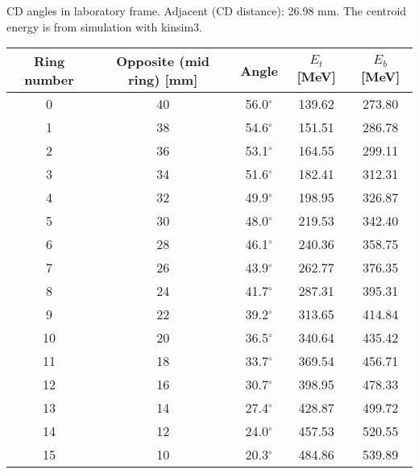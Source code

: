 \caption{CD angles in laboratory frame. Adjacent (CD distance): 26.98 mm. The centroid energy is from simulation with kinsim3.}
\label{tab:CD_angles}
\begin{tabular}{ccccc}
\hline
Ring number  &  Opposite (mid ring) [mm] &  Angle         &  $E_t$ [MeV]  &  $E_b$ [MeV]  \\
\hline
0            &  40                       &  56.0$^\circ$  &  139.62       &  273.80       \\
1            &  38                       &  54.6$^\circ$  &  151.51       &  286.78       \\
2            &  36                       &  53.1$^\circ$  &  164.55       &  299.11       \\
3            &  34                       &  51.6$^\circ$  &  182.41       &  312.31       \\
4            &  32                       &  49.9$^\circ$  &  198.95       &  326.87       \\
5            &  30                       &  48.0$^\circ$  &  219.53       &  342.40       \\
6            &  28                       &  46.1$^\circ$  &  240.36       &  358.75       \\
7            &  26                       &  43.9$^\circ$  &  262.77       &  376.35       \\
8            &  24                       &  41.7$^\circ$  &  287.31       &  395.31       \\
9            &  22                       &  39.2$^\circ$  &  313.65       &  414.84       \\
10           &  20                       &  36.5$^\circ$  &  340.64       &  435.42       \\
11           &  18                       &  33.7$^\circ$  &  369.54       &  456.71       \\
12           &  16                       &  30.7$^\circ$  &  398.95       &  478.33       \\
13           &  14                       &  27.4$^\circ$  &  428.87       &  499.72       \\
14           &  12                       &  24.0$^\circ$  &  457.53       &  520.55       \\
15           &  10                       &  20.3$^\circ$  &  484.86       &  539.89       \\
\hline
\end{tabular}